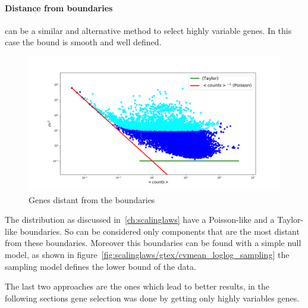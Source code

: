 \paragraph{Distance from boundaries} can be a similar and alternative method to select highly variable genes. In this case the bound is smooth and well defined.
\begin{figure}[htb!]
    \centering
    \includegraphics[width=0.8\linewidth]{pictures/topic/cvmean_oversampling.png}
    \caption{Genes distant from the boundaries}
    \label{fig:topic/cvmean_oversampling}
\end{figure}
The distribution as discussed in~\ref{ch:scalinglaws} have a Poisson-like and a Taylor-like boundaries. So can be considered only components that are the most distant from these boundaries. Moreover this boundaries can be found with a simple null model, as shown in figure~\ref{fig:scalinglaws/gtex/cvmean_loglog_sampling} the sampling model defines the lower bound of the data.

The last two approaches are the ones which lead to better results, in the following sections gene selection was done by getting only highly variables genes.